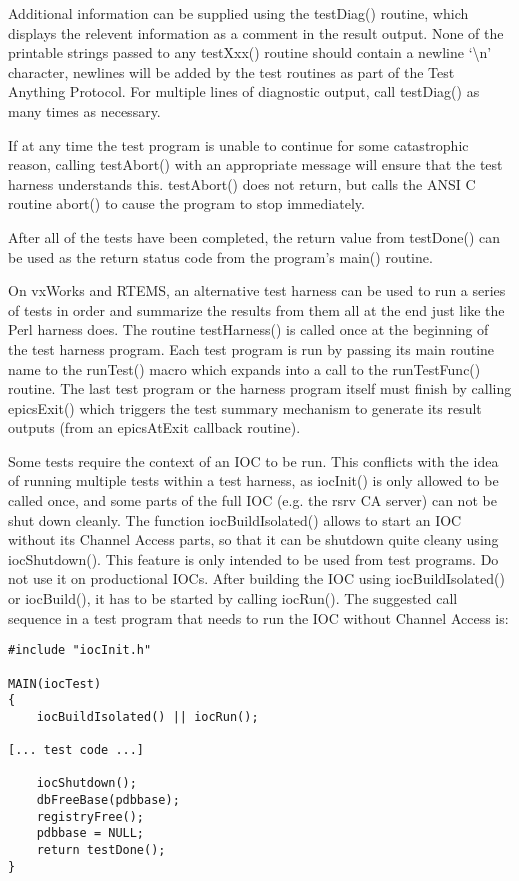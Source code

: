 Additional information can be supplied using the testDiag() routine, which displays the relevent information as a comment in the result output.
None of the printable strings passed to any testXxx() routine should contain a newline `\textbackslash{}n' character, newlines will be added by the test routines as part of the Test Anything Protocol.
For multiple lines of diagnostic output, call testDiag() as many times as necessary.

If at any time the test program is unable to continue for some catastrophic reason, calling testAbort() with an appropriate message will ensure that the test harness understands this. testAbort() does not return, but calls the ANSI C routine abort() to cause the program to stop immediately.

After all of the tests have been completed, the return value from testDone() can be used as the return status code from the program's main() routine.

On vxWorks and RTEMS, an alternative test harness can be used to run a series of tests in order and summarize the results from them all at the end just like the Perl harness does.
The routine testHarness() is called once at the beginning of the test harness program.
Each test program is run by passing its main routine name to the runTest() macro which expands into a 
call to the runTestFunc() routine.
The last test program or the harness program itself must finish by calling epicsExit() which triggers the test summary mechanism to generate its result outputs (from an epicsAtExit callback routine).

Some tests require the context of an IOC to be run. This conflicts with the idea of running multiple tests within a test harness, as iocInit() is only allowed to be called once, and some parts of the full IOC (e.g. the rsrv CA server) can not be shut down cleanly.
The function iocBuildIsolated() allows to start an IOC without its Channel Access parts, so that it can be shutdown quite cleany using iocShutdown(). This feature is only intended to be used from test programs. Do not use it on productional IOCs. After building the IOC using iocBuildIsolated() or iocBuild(), it has to be started by calling iocRun(). The suggested call sequence in a test program that needs to run the IOC without Channel Access is:

\begin{verbatim}
#include "iocInit.h"

MAIN(iocTest)
{
    iocBuildIsolated() || iocRun();

[... test code ...]

    iocShutdown();
    dbFreeBase(pdbbase);
    registryFree();
    pdbbase = NULL;
    return testDone();
}
\end{verbatim}


